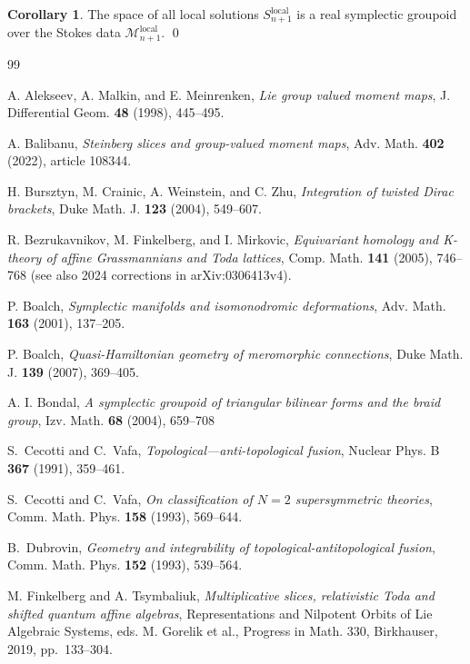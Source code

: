 \documentclass[a4paper,12pt,leqno]{amsart}
\numberwithin{equation}{section}
\theoremstyle{plain}
\theoremstyle{definition}
\newcommand{\cM}{\mathcal{M}}
\newtheorem{cor}[thm]{Corollary}
\begin{document}
\begin{cor}\label{cor:result}
The space of all local solutions $S^{\text{local}}_{n+1}$ is a real symplectic groupoid over the Stokes data $\cM_{n+1}^{\text{local}}$. 
\qed
\end{cor}







\begin{thebibliography}{99}

A. Alekseev, A. Malkin, and E. Meinrenken,
\emph{Lie group valued moment maps},
J. Differential Geom. \textbf{48} (1998), 445--495.

A. Balibanu,
\emph{Steinberg slices and group-valued moment maps},
Adv. Math. \textbf{402} (2022), article 108344.

H. Bursztyn, M. Crainic, A. Weinstein, and C. Zhu, {\em Integration of twisted Dirac brackets}, 
Duke Math. J. \textbf{123} (2004), 549--607.

R. Bezrukavnikov, M. Finkelberg, and I. Mirkovic,
\emph{Equivariant homology and K-theory of affine Grassmannians and Toda lattices},
Comp. Math. \textbf{141} (2005), 746--768
(see also 2024 corrections in arXiv:0306413v4).

P. Boalch,
\emph{Symplectic manifolds and isomonodromic deformations},
Adv. Math. \textbf{163} (2001), 137--205.

P. Boalch,
\emph{Quasi-Hamiltonian geometry of meromorphic connections}, Duke Math. J. \textbf{139} (2007), 369--405.

A. I. Bondal,
\emph{A symplectic groupoid of triangular bilinear forms and the braid group},
Izv. Math. \textbf{ 68} (2004), 659--708

S.~Cecotti and C.~Vafa,
\emph{Topological---anti-topological fusion},
Nuclear Phys. B
\textbf{367}
(1991),
359--461.

S.~Cecotti and C.~Vafa,
\emph{On classification of $N=2$ supersymmetric theories},
Comm. Math. Phys.
\textbf{158}
(1993),
569--644.

B.~Dubrovin,
\emph{Geometry and integrability of
topological-antitopological fusion},
Comm. Math. Phys.
\textbf{152}
(1993),
539--564.

M. Finkelberg and A. Tsymbaliuk,
\emph{Multiplicative slices, relativistic Toda and shifted quantum affine algebras},
Representations and Nilpotent Orbits of Lie Algebraic Systems,
eds. M. Gorelik et al.,
Progress in Math. 330,
Birkhauser,
2019,
pp.~133--304.


\end{thebibliography}
\end{document}
